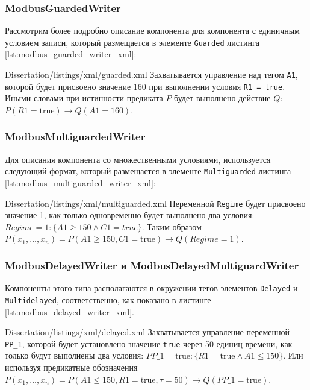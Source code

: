 \subsubsection{ModbusGuardedWriter}
Рассмотрим более подробно описание компонента для компонента с единичным условием записи,
который размещается в элементе \texttt{Guarded} листинга \ref{lst:modbus_guarded_writer_xml}:

        {Dissertation/listings/xml/guarded.xml}
Захватывается управление над тегом \texttt{A1}, которой будет присвоено значение 160
при выполнении условия \texttt{R1 = true}.
Иными словами при истинности предиката $P$ будет выполнено действие $Q$:
$P(R1=\mbox{true}) \to Q(A1=160)$.


\subsubsection{ModbusMultiguardedWriter}
Для описания компонента со множественными условиями, используется следующий формат,
который размещается в элементе \texttt{Multiguarded} листинга \ref{lst:modbus_multiguarded_writer_xml}:

        {Dissertation/listings/xml/multiguarded.xml}
Переменной \texttt{Regime} будет присвоено значение 1, как только 
одновременно будет выполнено два условия: $Regime = 1: \{A1 \ge 150 \wedge C1 = true\}$.
Таким образом $P(x_1,\ldots,x_n) = P(A1\ge150, C1=\mbox{true}) \to Q(Regime=1)$.

\subsubsection{ModbusDelayedWriter и ModbusDelayedMultiguardWriter}
Компоненты этого типа располагаются в окружении тегов элементов \texttt{Delayed} и \texttt{Multidelayed}, соответственно,
как показано в листинге \ref{lst:modbus_delayed_writer_xml}.

        {Dissertation/listings/xml/delayed.xml}
Захватывается управление переменной \texttt{PP\_1}, которой будет установлено значение \texttt{true}
через 50 единиц времени, как только будут выполнены два условия:
$PP\_1 = \mbox{true}: \{R1 = \mbox{true} \wedge A1 \le 150\}$.
Или используя предикатные обозначения
$P(x_1,\ldots,x_n) = P(A1\le150, R1=\mbox{true}, \tau=50) \to Q(PP\_1=\mbox{true})$.



